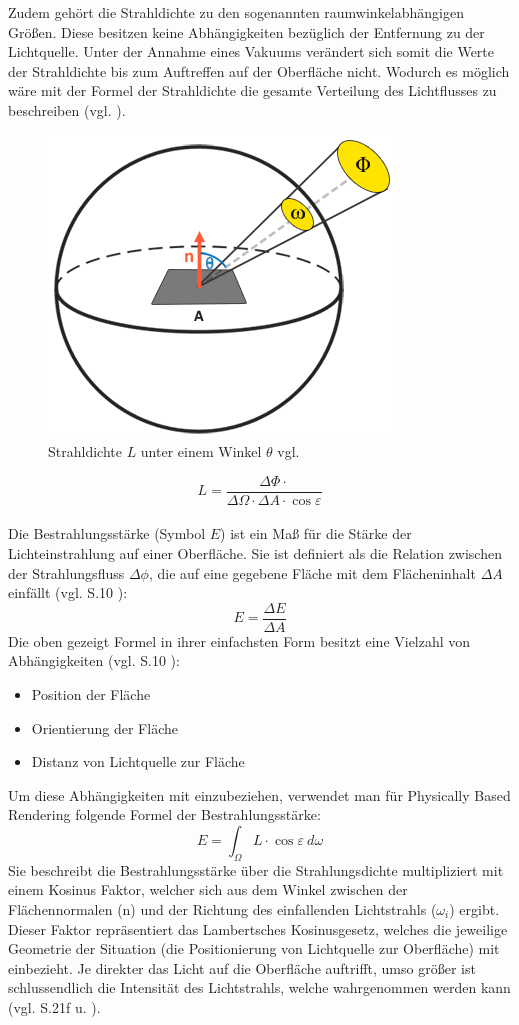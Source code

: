 \documentclass[
  11pt,
  a4paper,
  oneside
  ]{article}
\begin{document}
Zudem gehört die Strahldichte zu den sogenannten raumwinkelabhängigen Größen. Diese besitzen keine Abhängigkeiten bezüglich der Entfernung zu der Lichtquelle. Unter der Annahme eines Vakuums verändert sich somit die Werte der Strahldichte bis zum Auftreffen auf der Oberfläche nicht. Wodurch es möglich wäre mit der Formel der Strahldichte die gesamte Verteilung des Lichtflusses zu beschreiben
(vgl. \cite{gMueller}).  
\begin{figure}[H]
  \centering
  \includegraphics*[width=0.35 \textwidth]{images/radiance.png}
  \caption{Strahldichte $L$ unter einem Winkel $\theta$ vgl. \cite{learnOpenGL}}
  \label{fig:img4}
\end{figure}
\[L=\dfrac{\Delta \Phi \cdot }{\Delta \Omega \cdot \Delta A\cdot \cos \varepsilon }\] %
\\
Die Bestrahlungsstärke (Symbol $E$) ist ein Maß für die Stärke der Lichteinstrahlung auf einer Oberfläche. Sie ist definiert als die Relation zwischen der Strahlungsfluss $\Delta \phi$, die auf eine gegebene Fläche mit dem Flächeninhalt $\Delta A$ einfällt 
(vgl. S.10 \cite{GrundlagenLichtTechnik}):
\[E=\dfrac{\Delta E}{\Delta A}\]
Die oben gezeigt Formel in ihrer einfachsten Form besitzt eine Vielzahl von Abhängigkeiten (vgl. S.10 \cite{GrundlagenLichtTechnik}):
\begin{itemize}
  \item Position der Fläche
  \item Orientierung der Fläche
  \item Distanz von Lichtquelle zur Fläche
\end{itemize}

Um diese Abhängigkeiten mit einzubeziehen, verwendet man für Physically Based Rendering folgende Formel der Bestrahlungsstärke: 
\[E=\int _{\Omega }L\cdot \cos \varepsilon \ d\omega\]
Sie beschreibt die Bestrahlungsstärke über die Strahlungsdichte multipliziert mit einem Kosinus Faktor, welcher sich aus dem Winkel zwischen der Flächennormalen (n) und der Richtung des einfallenden Lichtstrahls ($\omega_{i}$) ergibt. Dieser Faktor repräsentiert das Lambertsches Kosinusgesetz, welches die jeweilige Geometrie der Situation (die Positionierung von Lichtquelle zur Oberfläche) mit einbezieht. Je direkter das Licht auf die Oberfläche auftrifft, umso größer ist schlussendlich die Intensität des Lichtstrahls, welche wahrgenommen werden kann 
(vgl. S.21f \cite{GRAY197813} u. \cite{Ryer97lightmeasurement,renderingEquationArticle}).
\end{document}
